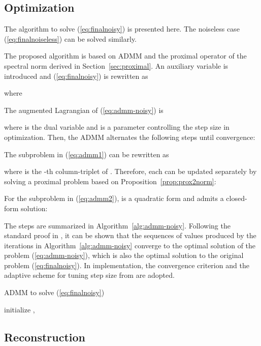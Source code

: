 \documentclass[10pt,journal,cspaper,compsoc]{IEEEtran}
\newcommand{\refEq}[1]{(\ref{#1})}
\newcommand{\refProp}[1]{Proposition~\ref{#1}}
\newcommand{\refSec}[1]{Section~\ref{#1}}
\newcommand{\refAlg}[1]{Algorithm~\ref{#1}}
\begin{document}
\subsection{Optimization}\label{sec:alg}

The algorithm to solve \refEq{eq:finalnoisy} is presented here. The noiseless case \refEq{eq:finalnoiseless} can be solved similarly.

The proposed algorithm is based on ADMM \cite{boyd2010distributed} and the proximal operator of the spectral norm derived in \refSec{sec:proximal}. An auxiliary variable  is introduced and \refEq{eq:finalnoisy} is rewritten as

where


The augmented Lagrangian of \refEq{eq:admm-noisy} is

where  is the dual variable and  is a parameter controlling the step size in optimization. Then, the ADMM alternates the following steps until convergence:


The subproblem in \refEq{eq:admm1} can be rewritten as

where  is the -th column-triplet of . Therefore, each  can be updated separately by solving a proximal problem based on \refProp{prop:prox2norm}:


For the subproblem in \refEq{eq:admm2},  is a quadratic form and admits a closed-form solution:
{\small

}

The steps are summarized in \refAlg{alg:admm-noisy}. Following the standard proof in \cite{boyd2010distributed}, it can be shown that the sequences of values produced by the iterations in \refAlg{alg:admm-noisy} converge to the optimal solution of the problem \refEq{eq:admm-noisy}, which is also the optimal solution to the original problem \refEq{eq:finalnoisy}. In implementation, the convergence criterion and the adaptive scheme for tuning step size  from \cite[Section 3]{boyd2010distributed} are adopted.

\begin{algorithm}
\LinesNumbered
\caption{ADMM to solve \refEq{eq:finalnoisy}}\label{alg:admm-noisy}
\small
\KwIn{, }
\KwOut{}
\vspace{0.5em}
initialize , \;
\vspace{0.5em}
\end{algorithm}
\vspace{-1em}

\subsection{Reconstruction}\label{sec:reconstr}
\end{document}
